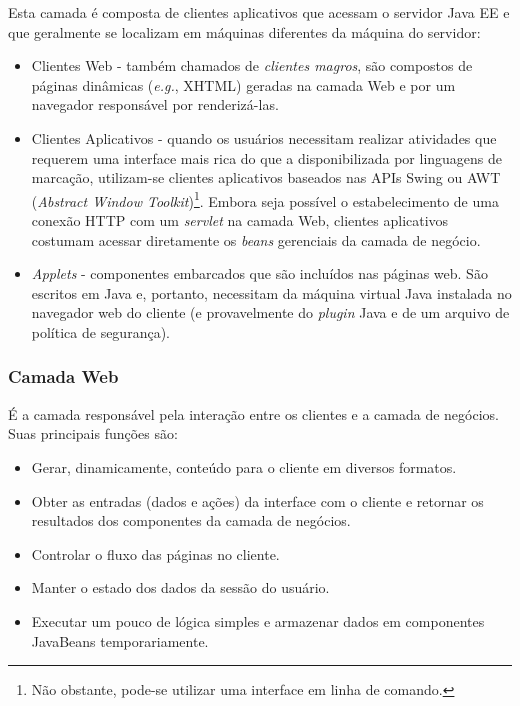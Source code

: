 \documentclass[
  10.5pt,				  %
	openright,			%
	twoside,			  %
  a5paper,
  chapter=TITLE,	%
	section=TITLE,	%
  hyphens,        %
	english,        %
	brazil          %
]{abntex2}
\begin{document}
Esta camada é composta de clientes aplicativos que acessam o servidor Java EE e que geralmente se localizam em máquinas diferentes da máquina do servidor:

\begin{itemize}
  \item Clientes Web - também chamados de \emph{clientes magros}, são compostos de páginas dinâmicas (\emph{e.g.}, XHTML) geradas na camada Web e por um navegador responsável por renderizá-las.
  \item Clientes Aplicativos - quando os usuários necessitam realizar atividades que requerem uma interface mais rica do que a disponibilizada por linguagens de marcação, utilizam-se clientes aplicativos baseados nas APIs Swing ou AWT (\emph{Abstract Window Toolkit})\footnote{Não obstante, pode-se utilizar uma interface em linha de comando.}. Embora seja possível o estabelecimento de uma conexão HTTP com um \emph{servlet} na camada Web, clientes aplicativos costumam acessar diretamente os \emph{beans} gerenciais da camada de negócio.
  \item \emph{Applets} - componentes embarcados que são incluídos nas páginas web. São escritos em Java e, portanto, necessitam da máquina virtual Java instalada no navegador web do cliente (e provavelmente do \emph{plugin} Java e de um arquivo de política de segurança).
\end{itemize}

\subsubsection{Camada Web}\label{sec:camada-web}

É a camada responsável pela interação entre os clientes e a camada de negócios. Suas principais funções são:
\begin{itemize}
  \item Gerar, dinamicamente, conteúdo para o cliente em diversos formatos.
  \item Obter as entradas (dados e ações) da interface com o cliente e retornar os resultados dos componentes da camada de negócios.
  \item Controlar o fluxo das páginas no cliente.
  \item Manter o estado dos dados da sessão do usuário.
  \item Executar um pouco de lógica simples e armazenar dados em componentes JavaBeans temporariamente.
\end{itemize}
\end{document}
